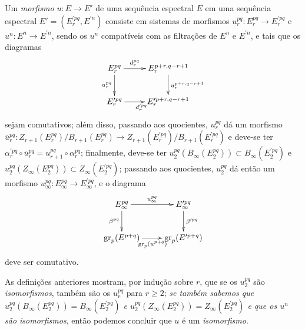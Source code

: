 \begin{env}[11.1.2]
\label{0.11.1.2}
Um \emph{morfismo $u:E\to E'$} de uma sequência espectral $E$ em uma sequência espectral $E'=(E_r^{\prime pq},E^{\prime n})$ consiste em sistemas de morfismos $u_r^{pq}:E_r^{pq}\to E_r^{\prime pq}$ e $u^n:E^n\to E^{\prime n}$, sendo os $u^n$ compatíveis com as filtrações de $E^n$ e $E^{\prime n}$, e tais que os diagramas
\[
  \xymatrix{
    E_r^{pq}\ar[r]^-{d_r^{pq}}\ar[d]_{u_r^{pq}} &
    E_r^{p+r,q-r+1}\ar[d]^{u_r^{p+r,q-r+1}}\\
    E_r^{\prime pq}\ar[r]_{d_r^{\prime pq}} &
    E_r^{\prime p+r,q-r+1}
  }
\]
sejam comutativos; além disso, passando aos quocientes, $u_r^{pq}$ dá um morfismo $\overline{u}_r^{pq}:Z_{r+1}(E_r^{pq})/B_{r+1}(E_r^{pq})\to Z_{r+1}(E_r^{\prime pq})/B_{r+1}(E_r^{\prime pq})$ e deve-se ter $\alpha_r^{\prime pq}\circ\overline{u}_r^{pq}=u_{r+1}^{pq}\circ\alpha_r^{pq}$; finalmente, deve-se ter $u_2^{pq}(B_\infty(E_2^{pq}))\subset B_\infty(E_2^{\prime pq})$ e $u_2^{pq}(Z_\infty(E_2^{pq}))\subset Z_\infty(E_2^{\prime pq})$; passando aos quocientes, $u_2^{pq}$ dá então um morfismo $u_\infty^{pq}:E_\infty^{pq}\to E_\infty^{\prime pq}$, e o diagrama
\[
  \xymatrix{
    E_\infty^{pq}\ar[r]^-{u_\infty^{pq}}\ar[d]_{\beta^{pq}} &
    E_\infty^{\prime pq}\ar[d]^{\beta^{\prime pq}}\\
    \gr_p(E^{p+q})\ar[r]_{\gr_p(u^{p+q})} &
    \gr_p(E^{\prime p+q})
  }
\]
deve ser comutativo.

As definições anteriores mostram, por indução sobre $r$, que se os $u_2^{pq}$ são \emph{isomorfismos}, também são os $u_r^{pq}$ para $r\geq 2$; \emph{se também sabemos que $u_2^{pq}(B_\infty(E_2^{pq}))=B_\infty(E_2^{\prime pq})$ e $u_2^{pq}(Z_\infty(E_2^{pq}))=Z_\infty(E_2^{\prime pq})$ e que os $u^n$ são isomorfismos}, então podemos concluir que $u$ é um \emph{isomorfismo}.
\end{env}

